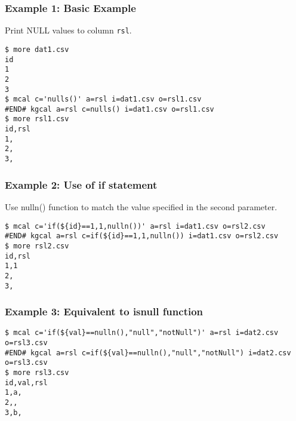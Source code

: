 \subsubsection*{Example 1: Basic Example}

Print NULL values to column \verb|rsl|. 


\begin{Verbatim}[baselinestretch=0.7,frame=single]
$ more dat1.csv
id
1
2
3
$ mcal c='nulls()' a=rsl i=dat1.csv o=rsl1.csv
#END# kgcal a=rsl c=nulls() i=dat1.csv o=rsl1.csv
$ more rsl1.csv
id,rsl
1,
2,
3,
\end{Verbatim}
\subsubsection*{Example 2: Use of if statement}

Use nulln() function to match the value specified in the second parameter.


\begin{Verbatim}[baselinestretch=0.7,frame=single]
$ mcal c='if(${id}==1,1,nulln())' a=rsl i=dat1.csv o=rsl2.csv
#END# kgcal a=rsl c=if(${id}==1,1,nulln()) i=dat1.csv o=rsl2.csv
$ more rsl2.csv
id,rsl
1,1
2,
3,
\end{Verbatim}
\subsubsection*{Example 3: Equivalent to isnull function}



\begin{Verbatim}[baselinestretch=0.7,frame=single]
$ mcal c='if(${val}==nulln(),"null","notNull")' a=rsl i=dat2.csv o=rsl3.csv
#END# kgcal a=rsl c=if(${val}==nulln(),"null","notNull") i=dat2.csv o=rsl3.csv
$ more rsl3.csv
id,val,rsl
1,a,
2,,
3,b,
\end{Verbatim}
